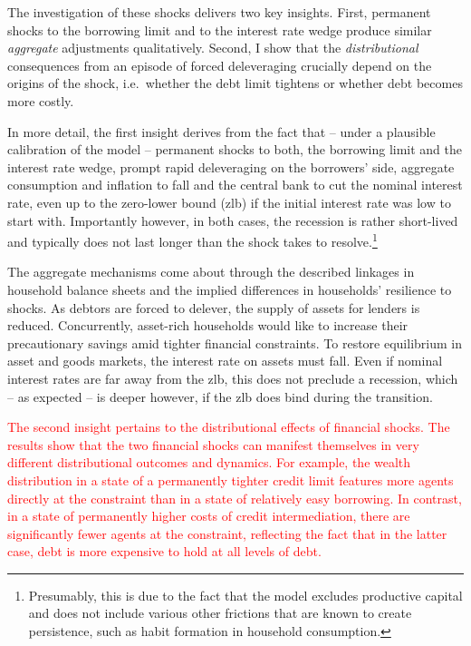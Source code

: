\documentclass[12pt]{article} %
\numberwithin{equation}{section} %
\numberwithin{figure}{section}
\numberwithin{table}{section}
\begin{document}


The investigation of these shocks delivers two key insights. First, permanent shocks to the borrowing limit and to the interest rate wedge produce similar \textit{aggregate} adjustments qualitatively. Second, I show that the \textit{distributional} consequences from an episode of forced deleveraging crucially depend on the origins of the shock, i.e.~whether the debt limit tightens or whether debt becomes more costly.

In more detail, the first insight derives from the fact that -- under a plausible calibration of the model -- permanent shocks to both, the borrowing limit and the interest rate wedge, prompt rapid deleveraging on the borrowers' side, aggregate consumption and inflation to fall and the central bank to cut the nominal interest rate, even up to the zero-lower bound (\Gls{zlb}) if the initial interest rate was low to start with. Importantly however, in both cases, the recession is rather short-lived and typically does not last longer than the shock takes to resolve.\footnote{Presumably, this is due to the fact that the model excludes productive capital and does not include various other frictions that are known to create persistence, such as habit formation in household consumption.} 

The aggregate mechanisms come about through the described linkages in household balance sheets and the implied differences in households' resilience to shocks. As debtors are forced to delever, the supply of assets for lenders is reduced. Concurrently, asset-rich households would like to increase their precautionary savings amid tighter financial constraints. To restore equilibrium in asset and goods markets, the interest rate on assets must fall. Even if nominal interest rates are far away from the \Gls{zlb}, this does not preclude a recession, which -- as expected -- is deeper however, if the \Gls{zlb} does bind during the transition. 

\textcolor{red}{The second insight pertains to the distributional effects of financial shocks. The results show that the two financial shocks can manifest themselves in very different distributional outcomes and dynamics. For example, the wealth distribution in a state of a permanently tighter credit limit features more agents directly at the constraint than in a state of relatively easy borrowing. In contrast, in a state of permanently higher costs of credit intermediation, there are significantly fewer agents at the constraint, reflecting the fact that in the latter case, debt is more expensive to hold at all levels of debt.}
\end{document}
